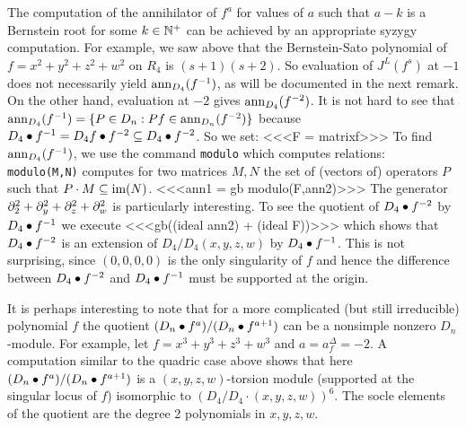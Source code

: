 \begin{remark}
The computation of the annihilator 
of $f^a$ for values of $a$ such that $a-k$ is a
Bernstein root for some $k\in{\mathbb N}^+$ can be achieved by an appropriate
syzygy computation. For example, we saw above
that the Bernstein-Sato
polynomial of $f=x^2+y^2+z^2+w^2$ on $R_4$ is $(s+1)(s+2)$. So
evaluation of $J^L(f^s)$ at $-1$ does not necessarily yield
$\operatorname{ann}_{D_4}(f^{-1})$, as will be documented in the next remark. 
On the other hand, evaluation at $-2$ gives
$\operatorname{ann}_{D_4}(f^{-2})$. It is not hard to see that
$\operatorname{ann}_{D_4}(f^{-1})=\{P\in D_n:Pf\in \operatorname{ann}_{D_n}(f^{-2})\}$ because
$D_4\bullet f^{-1}=D_4f\bullet f^{-2}
\subseteq D_4\bullet f^{-2}$. So we set:
<<<F = matrix{{f}}>>>
To find $\operatorname{ann}_{D_4}(f^{-1})$, we use the command {\tt modulo} which
computes relations: {\tt modulo(M,N)} computes for two matrices $M, N$
the set of (vectors of) operators $P$ such that $P\cdot M\subseteq \operatorname{im}(N)$. 
<<<ann1 = gb modulo(F,ann2)>>>
The generator $\partial_2^2+\partial_y^2+\partial_z^2+\partial_w^2$ is particularly interesting. 
To see the quotient of
$D_4\bullet f^{-2}$ by $D_4\bullet f^{-1}$ we execute
<<<gb((ideal ann2) + (ideal F))>>>
which shows that $D_4\bullet f^{-2}$ is an extension of
$D_4/D_4(x,y,z,w)$ by $D_4\bullet f^{-1}$. This is not surprising,
since $(0,0,0,0)$ is the only singularity of $f$ and hence the
difference between $D_4\bullet f^{-2}$ and $D_4\bullet f^{-1}$ must be
supported at the origin.

It is perhaps interesting to note that for a more complicated (but still
irreducible) polynomial $f$ the
quotient $({D_n\bullet f^{a}})/({D_n\bullet f^{a+1}})$ can
be a nonsimple nonzero $D_n$-module. For example, let
$f=x^3+y^3+z^3+w^3$ and $a=a^\Delta_f=-2$. 
A computation similar to the quadric case above
shows that here $({D_n\bullet f^{a}})/({D_n\bullet f^{a+1}})$ is a
$(x,y,z,w)$-torsion module (supported at the singular locus of $f$)
isomorphic to $(D_4/D_4\cdot (x,y,z,w))^6$. The socle elements of the
quotient are the degree 2 polynomials in $x,y,z,w$.
\end{remark}


